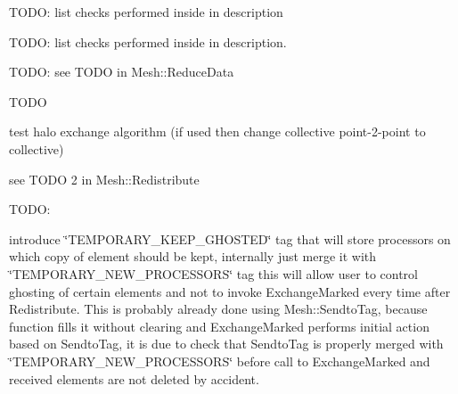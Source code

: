 \begin{DoxyRefList}
\begin{DoxyEnumerate}
\end{DoxyEnumerate}
\item[\label{todo__todo000012}%
\hypertarget{todo__todo000012}{}%
Member \hyperlink{classINMOST_1_1Mesh_a55549e9d46cd92e2f3122e1516f3c9fd}{I\-N\-M\-O\-S\-T\-:\-:Mesh\-:\-:Begin\-Topology\-Check} (Element\-Type etype, const Handle\-Type $\ast$adj, enumerator num)]T\-O\-D\-O\-: list checks performed inside in description  
\item[\label{todo__todo000013}%
\hypertarget{todo__todo000013}{}%
Member \hyperlink{classINMOST_1_1Mesh_a1c6c26bcbe6e7a0cba093c0b8312ba04}{I\-N\-M\-O\-S\-T\-:\-:Mesh\-:\-:End\-Topology\-Check} (Handle\-Type e)]T\-O\-D\-O\-: list checks performed inside in description.  
\item[\label{todo__todo000006}%
\hypertarget{todo__todo000006}{}%
Member \hyperlink{classINMOST_1_1Mesh_aa3e1067bc3139bb0216f7ce3c1936734}{I\-N\-M\-O\-S\-T\-:\-:Mesh\-:\-:Exchange\-Data} (const Tag \&tag, Element\-Type mask, Marker\-Type select)]T\-O\-D\-O\-: see T\-O\-D\-O in Mesh\-::\-Reduce\-Data 
\item[\label{todo__todo000008}%
\hypertarget{todo__todo000008}{}%
Member \hyperlink{classINMOST_1_1Mesh_ae44b9cfcb8964acbd710562df331a51a}{I\-N\-M\-O\-S\-T\-:\-:Mesh\-:\-:Exchange\-Marked} (enum Action action=A\-Ghost)]T\-O\-D\-O
\begin{DoxyEnumerate}
\item test halo exchange algorithm (if used then change collective point-\/2-\/point to collective)
\item see T\-O\-D\-O 2 in Mesh\-::\-Redistribute 
\end{DoxyEnumerate}
\item[\label{todo__todo000009}%
\hypertarget{todo__todo000009}{}%
Member \hyperlink{classINMOST_1_1Mesh_ade20ec7c8563e82bf8057bc47a3314b7}{I\-N\-M\-O\-S\-T\-:\-:Mesh\-:\-:Redistribute} ()]T\-O\-D\-O\-:
\begin{DoxyEnumerate}
\item introduce \char`\"{}\-T\-E\-M\-P\-O\-R\-A\-R\-Y\-\_\-\-K\-E\-E\-P\-\_\-\-G\-H\-O\-S\-T\-E\-D\char`\"{} tag that will store processors on which copy of element should be kept, internally just merge it with \char`\"{}\-T\-E\-M\-P\-O\-R\-A\-R\-Y\-\_\-\-N\-E\-W\-\_\-\-P\-R\-O\-C\-E\-S\-S\-O\-R\-S\char`\"{} tag this will allow user to control ghosting of certain elements and not to invoke Exchange\-Marked every time after Redistribute. This is probably already done using Mesh\-::\-Sendto\-Tag, because function fills it without clearing and Exchange\-Marked performs initial action based on Sendto\-Tag, it is due to check that Sendto\-Tag is properly merged with \char`\"{}\-T\-E\-M\-P\-O\-R\-A\-R\-Y\-\_\-\-N\-E\-W\-\_\-\-P\-R\-O\-C\-E\-S\-S\-O\-R\-S\char`\"{} before call to Exchange\-Marked and received elements are not deleted by accident.

\end{DoxyEnumerate}
\end{DoxyRefList}
